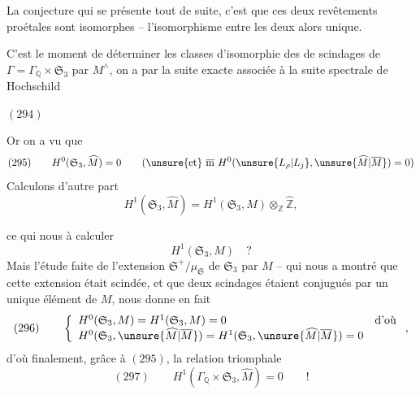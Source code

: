 La conjecture qui se présente tout de suite, c'est que ces deux revêtements proétales sont isomorphes -- l'isomorphisme entre les deux  alors unique.


 C'est le moment de déterminer les classes d'isomorphie des  de scindages de  $\Gamma=\Gamma_{\mathbb Q}\times\mathfrak S_3$ par $M^{\wedge}$, on a par la suite exacte associée à la suite spectrale de Hochschild

\begin{samepage}
$(294)$\quad
{}
\end{samepage}

Or on a vu que
\[
(295)\qquad H^0(\mathfrak S_3,\widehat M)=0
\qquad(\text{\unsure{et} }\overline{\mathrm m}\ H^0(\unsure{L_\rho|L_j},\unsure{\widehat M|\overline M})=0)
\]
 Calculons d'autre part
\[
H^1(\mathfrak S_3,\widehat M)=H^1(\mathfrak S_3,M)\otimes_{\mathbb Z}\widehat{\mathbb Z},
\]




ce qui nous  à calculer
\[
H^1(\mathfrak S_3,M)\quad ?
\]
Mais l'étude faite de l'extension $\mathfrak S^+/\mu_{\mathfrak S}$ de $\mathfrak S_3$ par $M$ -- qui nous a montré que cette extension était scindée, et que deux scindages étaient conjugués par un unique élément de $M$, nous donne en fait
\[
(296)\qquad
\left\{\begin{array}{ll}
H^0(\mathfrak S_3,M)=H^1(\mathfrak S_3,M)=0&\text{d'où}\\
H^0(\mathfrak S_3,\unsure{\widehat M|\overline M})=H^1(\mathfrak S_3,\unsure{\widehat M|\overline M})=0&
\end{array}\right.
,
\]
d'où finalement, grâce à $(295)$, la relation triomphale
\[
(297)\qquad\boxed{H^1(\Gamma_{\mathbb Q}\times\mathfrak S_3,\widehat M)=0}\qquad !
\]

